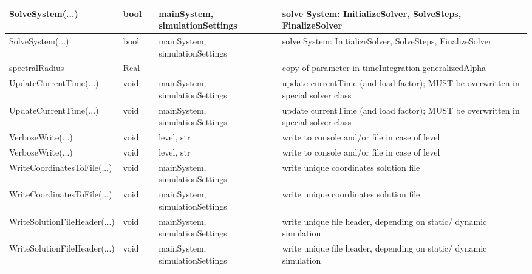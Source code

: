 \begin{center}
\begin{longtable}{| p{4.2cm} | p{2.5cm} | p{0.3cm} | p{3.0cm} | p{6cm} |}
    SolveSystem(...) &     bool &      &     mainSystem, simulationSettings &     solve System: InitializeSolver, SolveSteps, FinalizeSolver\\ \hline
    SolveSystem(...) &     bool &      &     mainSystem, simulationSettings &     solve System: InitializeSolver, SolveSteps, FinalizeSolver\\ \hline
    spectralRadius &     Real &      &      &     copy of parameter in timeIntegration.generalizedAlpha\\ \hline
    UpdateCurrentTime(...) &     void &      &     mainSystem, simulationSettings &     update currentTime (and load factor); MUST be overwritten in special solver class\\ \hline
    UpdateCurrentTime(...) &     void &      &     mainSystem, simulationSettings &     update currentTime (and load factor); MUST be overwritten in special solver class\\ \hline
    VerboseWrite(...) &     void &      &     level, str &     write to console and/or file in case of level\\ \hline
    VerboseWrite(...) &     void &      &     level, str &     write to console and/or file in case of level\\ \hline
    WriteCoordinatesToFile(...) &     void &      &     mainSystem, simulationSettings &     write unique coordinates solution file\\ \hline
    WriteCoordinatesToFile(...) &     void &      &     mainSystem, simulationSettings &     write unique coordinates solution file\\ \hline
    WriteSolutionFileHeader(...) &     void &      &     mainSystem, simulationSettings &     write unique file header, depending on static/ dynamic simulation\\ \hline
    WriteSolutionFileHeader(...) &     void &      &     mainSystem, simulationSettings &     write unique file header, depending on static/ dynamic simulation\\ \hline
	  \end{longtable}
	\end{center}



